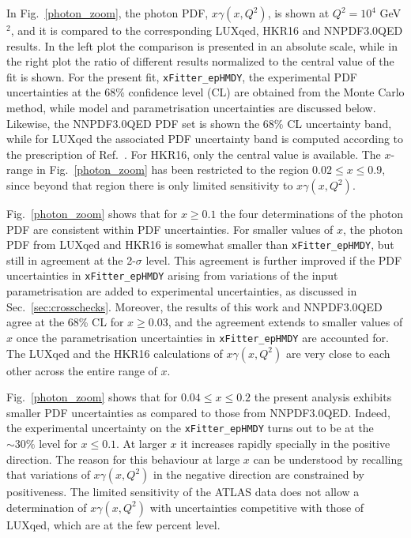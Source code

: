 In Fig.~\ref{photon_zoom}, the photon PDF, $x\gamma(x,Q^2)$, is shown at
$Q^2=10^4$ GeV$^2$,  and it is compared to the corresponding LUXqed,
HKR16 and NNPDF3.0QED results.
%
In the left plot the comparison is presented in an absolute scale, while
in the right plot the ratio of
different results normalized to
the central value of the fit is shown.
%
For the present fit, {\tt xFitter\_epHMDY}, 
the experimental PDF uncertainties at the 68\% confidence level (CL) are obtained from the Monte Carlo method,
 while model and parametrisation uncertainties are discussed below.
Likewise, the  NNPDF3.0QED PDF set is shown the 68\% CL uncertainty band,
while for LUXqed the associated PDF uncertainty band is computed according to the
prescription of Ref.~\cite{Manohar:2016nzj}.
For HKR16, only the central value is available.
%
The $x$-range in Fig.~\ref{photon_zoom} has been restricted to the region
$0.02 \le x \le 0.9$, since beyond that region there is only limited sensitivity to $x\gamma(x,Q^2)$.

Fig.~\ref{photon_zoom} shows that for $x\ge 0.1$ the four determinations of
the photon PDF are consistent within PDF uncertainties.
%
For smaller values of $x$, the photon PDF from LUXqed and HKR16 is somewhat smaller than {\tt xFitter\_epHMDY},
but still in agreement at the 2-$\sigma$ level.
%
This agreement is further improved if the PDF uncertainties in
{\tt xFitter\_epHMDY}
arising from variations of the input parametrisation are added to experimental
uncertainties, as discussed in Sec.~\ref{sec:crosschecks}.
%
Moreover, the results of this work and NNPDF3.0QED agree at the 68\% CL for $x\ge 0.03$,
and the agreement extends to smaller values of $x$ once the parametrisation
uncertainties in {\tt xFitter\_epHMDY} are accounted for.
%
The LUXqed and the HKR16 calculations of $x\gamma(x,Q^2)$ are very close
to each other across the entire range of $x$.

Fig.~\ref{photon_zoom} shows that
for $0.04 \le x \le 0.2$ the present analysis  exhibits smaller PDF
uncertainties as compared to those from  NNPDF3.0QED.
%
Indeed, the experimental uncertainty on the {\tt xFitter\_epHMDY}
turns out to be at the  $\sim 30\%$ level for $x\le 0.1$.
At larger $x$ it increases rapidly
specially in the positive direction.
%
The reason for this behaviour at large $x$ can be understood by recalling that
variations of $x\gamma(x,Q^2)$ in the negative
direction are constrained by positiveness.
%
The limited sensitivity of the ATLAS data  does not allow a determination of $x\gamma(x,Q^2)$ with uncertainties
competitive with those of LUXqed, which are at the few percent level.

